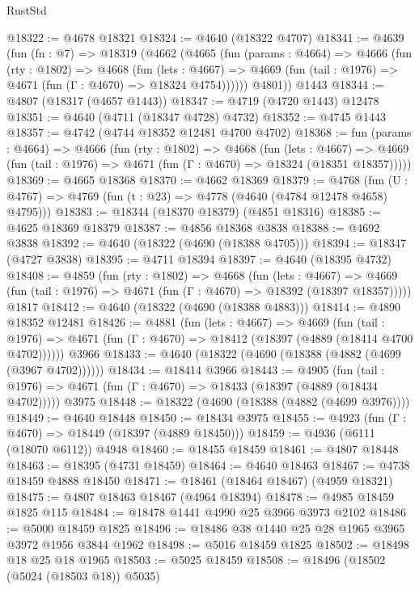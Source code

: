 \begin{lexlean}{RustStd}
\begin{coremodule}
@18322 := @4678 @18321
@18324 := @4640 (@18322 @4707)
@18341 := @4639
    (fun (fn : @7) =>
    @18319
      (@4662
        (@4665
          (fun (params : @4664) =>
          @4666
            (fun (rty : @1802) =>
            @4668
              (fun (lets : @4667) =>
              @4669 (fun (tail : @1976) => @4671 (fun (Γ : @4670) => @18324 @4754))))))
        @4801))
    @1443
@18344 := @4807 (@18317 (@4657 @1443))
@18347 := @4719 (@4720 @1443) @12478
@18351 := @4640 (@4711 (@18347 @4728) @4732)
@18352 := @4745 @1443
@18357 := @4742 (@4744 @18352 @12481 @4700 @4702)
@18368 := fun (params : @4664) =>
  @4666
    (fun (rty : @1802) =>
    @4668
      (fun (lets : @4667) =>
      @4669 (fun (tail : @1976) => @4671 (fun (Γ : @4670) => @18324 (@18351 @18357)))))
@18369 := @4665 @18368
@18370 := @4662 @18369
@18379 := @4768
    (fun (U : @4767) => @4769 (fun (t : @23) => @4778 (@4640 (@4784 @12478 @4658) @4795)))
@18383 := @18344 (@18370 @18379) (@4851 @18316)
@18385 := @4625 @18369 @18379
@18387 := @4856 @18368 @3838
@18388 := @4692 @3838
@18392 := @4640 (@18322 (@4690 (@18388 @4705)))
@18394 := @18347 (@4727 @3838)
@18395 := @4711 @18394
@18397 := @4640 (@18395 @4732)
@18408 := @4859
    (fun (rty : @1802) =>
    @4668
      (fun (lets : @4667) =>
      @4669 (fun (tail : @1976) => @4671 (fun (Γ : @4670) => @18392 (@18397 @18357)))))
    @1817
@18412 := @4640 (@18322 (@4690 (@18388 @4883)))
@18414 := @4890 @18352 @12481
@18426 := @4881
    (fun (lets : @4667) =>
    @4669
      (fun (tail : @1976) =>
      @4671 (fun (Γ : @4670) => @18412 (@18397 (@4889 (@18414 @4700 @4702))))))
    @3966
@18433 := @4640 (@18322 (@4690 (@18388 (@4882 (@4699 (@3967 @4702))))))
@18434 := @18414 @3966
@18443 := @4905
    (fun (tail : @1976) => @4671 (fun (Γ : @4670) => @18433 (@18397 (@4889 (@18434 @4702)))))
    @3975
@18448 := @18322 (@4690 (@18388 (@4882 (@4699 @3976))))
@18449 := @4640 @18448
@18450 := @18434 @3975
@18455 := @4923 (fun (Γ : @4670) => @18449 (@18397 (@4889 @18450)))
@18459 := @4936 (@6111 (@18070 @6112)) @4948
@18460 := @18455 @18459
@18461 := @4807 @18448
@18463 := @18395 (@4731 @18459)
@18464 := @4640 @18463
@18467 := @4738 @18459 @4888 @18450
@18471 := @18461 (@18464 @18467) (@4959 @18321)
@18475 := @4807 @18463 @18467 (@4964 @18394)
@18478 := @4985 @18459 @1825 @115
@18484 := @18478 @1441 @4990 @25 @3966 @3973 @2102
@18486 := @5000 @18459 @1825
@18496 := @18486 @38 @1440 @25 @28 @1965 @3965 @3972 @1956 @3844 @1962
@18498 := @5016 @18459 @1825
@18502 := @18498 @18 @25 @18 @1965
@18503 := @5025 @18459
@18508 := @18496 (@18502 (@5024 (@18503 @18)) @5035)

\end{coremodule}
\end{lexlean}
